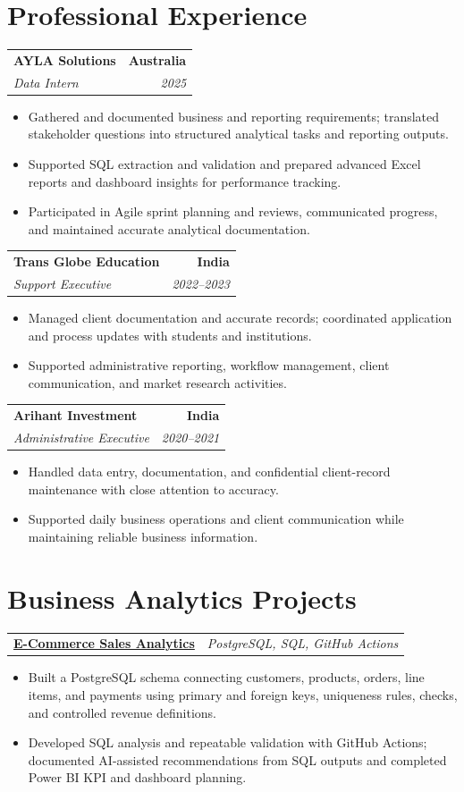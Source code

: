 \documentclass[letterpaper,10pt]{article}
\makeatletter
\newcommand{\role}[4]{%
  \begin{tabularx}{\textwidth}{@{}Xr@{}}
    \textbf{#1} & \textbf{#2} \\
    \textit{#3} & \textit{#4}
  \end{tabularx}\vspace{-1pt}
}
\newcommand{\project}[2]{%
  \begin{tabularx}{\textwidth}{@{}Xr@{}}
    \textbf{#1} & \textit{#2}
  \end{tabularx}\vspace{-1pt}
}
\makeatother
\begin{document}
\section{Professional Experience}
\role{AYLA Solutions}{Australia}{Data Intern}{2025}
\begin{itemize}
  \item Gathered and documented business and reporting requirements; translated stakeholder questions into structured analytical tasks and reporting outputs.
  \item Supported SQL extraction and validation and prepared advanced Excel reports and dashboard insights for performance tracking.
  \item Participated in Agile sprint planning and reviews, communicated progress, and maintained accurate analytical documentation.
\end{itemize}
\vspace{1pt}

\role{Trans Globe Education}{India}{Support Executive}{2022--2023}
\begin{itemize}
  \item Managed client documentation and accurate records; coordinated application and process updates with students and institutions.
  \item Supported administrative reporting, workflow management, client communication, and market research activities.
\end{itemize}
\vspace{1pt}

\role{Arihant Investment}{India}{Administrative Executive}{2020--2021}
\begin{itemize}
  \item Handled data entry, documentation, and confidential client-record maintenance with close attention to accuracy.
  \item Supported daily business operations and client communication while maintaining reliable business information.
\end{itemize}

\section{Business Analytics Projects}
\project{\href{https://github.com/jainalimehta/Ecommerce-Sales-Analytics}{E-Commerce Sales Analytics}}{PostgreSQL, SQL, GitHub Actions}
\begin{itemize}
  \item Built a PostgreSQL schema connecting customers, products, orders, line items, and payments using primary and foreign keys, uniqueness rules, checks, and controlled revenue definitions.
  \item Developed SQL analysis and repeatable validation with GitHub Actions; documented AI-assisted recommendations from SQL outputs and completed Power BI KPI and dashboard planning.
\end{itemize}
\vspace{1pt}
\end{document}
